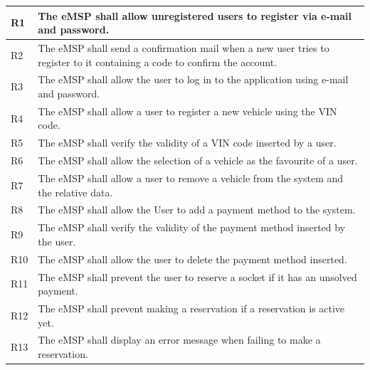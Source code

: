 \documentclass{Configuration_Files/PoliMi3i_thesis}
\begin{document}
 \begin{xltabular}{\textwidth}{| >{}l | X |}
\hline
R1 &
    The eMSP shall allow unregistered users to register via e-mail and password. \B\\
\hline
 
R2  &
   The eMSP shall send a confirmation mail when a new user tries to register to it containing a code to confirm the account.\B\\
\hline

R3  &
    The eMSP shall allow the user to log in to the application using e-mail and password.\B\\
\hline

R4  &
    The eMSP shall allow a user to register a new vehicle using the VIN code.\B\\
\hline

R5  &
    The eMSP shall verify the validity of a VIN code inserted by a user.\B\\
\hline

R6  &
    The eMSP shall allow the selection of a vehicle as the favourite of a user.\B\\
\hline

R7  &
    The eMSP shall allow a user to remove a vehicle from the system and the relative data.\B\\
\hline

R8  &
   The eMSP shall allow the User to add a payment method to the system.\B\\
\hline

R9  &
   The eMSP shall verify the validity of the payment method inserted by the user.\B\\
\hline

R10  &
   The eMSP shall allow the user to delete the payment method inserted.\B\\
\hline

R11  &
    The eMSP shall prevent the user to reserve a socket if it has an unsolved payment.\B\\
\hline

R12  &
   The eMSP shall prevent making a reservation if a reservation is active yet.\B\\
\hline

R13  &
    The eMSP shall display an error message when failing to make a reservation.\B\\
\hline


\end{xltabular}
\end{document}
